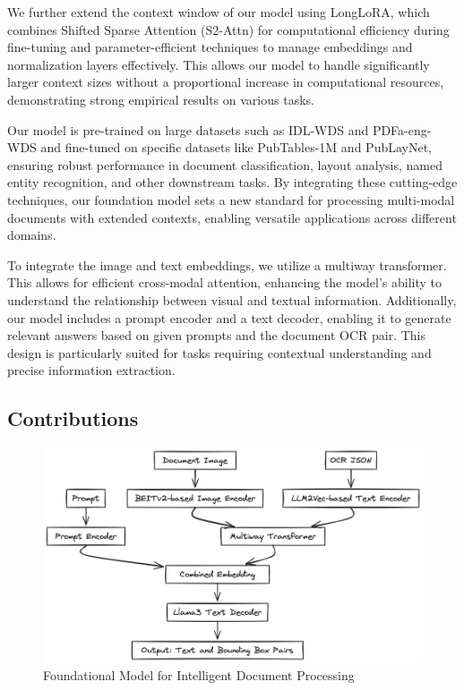 \documentclass{article}
\begin{document}
We further extend the context window of our model using LongLoRA, which combines Shifted Sparse Attention (S2-Attn) for computational efficiency during fine-tuning and parameter-efficient techniques to manage embeddings and normalization layers effectively. This allows our model to handle significantly larger context sizes without a proportional increase in computational resources, demonstrating strong empirical results on various tasks.

Our model is pre-trained on large datasets such as IDL-WDS and PDFa-eng-WDS and fine-tuned on specific datasets like PubTables-1M and PubLayNet, ensuring robust performance in document classification, layout analysis, named entity recognition, and other downstream tasks. By integrating these cutting-edge techniques, our foundation model sets a new standard for processing multi-modal documents with extended contexts, enabling versatile applications across different domains.

To integrate the image and text embeddings, we utilize a multiway transformer. This allows for efficient cross-modal attention, enhancing the model’s ability to understand the relationship between visual and textual information. Additionally, our model includes a prompt encoder and a text decoder, enabling it to generate relevant answers based on given prompts and the document OCR pair. This design is particularly suited for tasks requiring contextual understanding and precise information extraction.

\subsection*{Contributions}

\begin{figure}[h]
    \centering
    \includegraphics[width=\linewidth]{foundational_model.png}
    \caption{Foundational Model for Intelligent Document Processing}
    \label{fig:foundational-model}
\end{figure}
\end{document}
